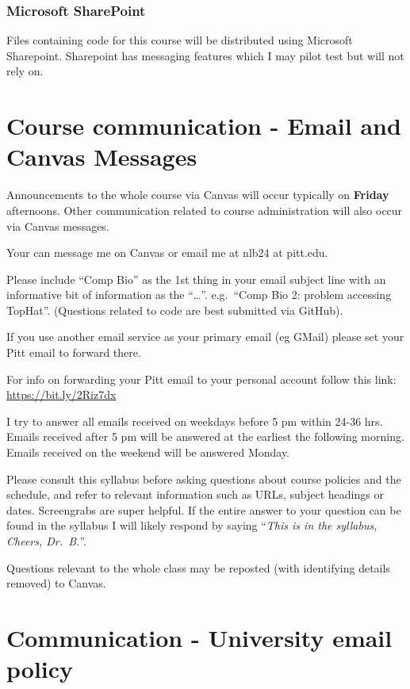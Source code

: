 \documentclass[
]{book}
\begin{document}
\hypertarget{microsoft-sharepoint}{%
\subsection{Microsoft SharePoint}\label{microsoft-sharepoint}}

Files containing code for this course will be distributed using Microsoft Sharepoint. Sharepoint has messaging features which I may pilot test but will not rely on.

\hypertarget{email_and_canvas_msg}{%
\chapter{Course communication - Email and Canvas Messages}\label{email_and_canvas_msg}}

Announcements to the whole course via Canvas will occur typically on \textbf{Friday} afternoons. Other communication related to course administration will also occur via Canvas messages.

Your can message me on Canvas or email me at nlb24 at pitt.edu.

Please include ``Comp Bio'' as the 1st thing in your email subject line with an informative bit of information as the ``\ldots{}''. e.g.~``Comp Bio 2: problem accessing TopHat''. (Questions related to code are best submitted via GitHub).

If you use another email service as your primary email (eg GMail) please set your Pitt email to forward there.

For info on forwarding your Pitt email to your personal account follow this link: \url{https://bit.ly/2Riz7dx}

I try to answer all emails received on weekdays before 5 pm within 24-36 hrs. Emails received after 5 pm will be answered at the earliest the following morning. Emails received on the weekend will be answered Monday.

Please consult this syllabus before asking questions about course policies and the schedule, and refer to relevant information such as URLs, subject headings or dates. Screengrabs are super helpful. If the entire answer to your question can be found in the syllabus I will likely respond by saying ``\emph{This is in the syllabus, Cheers, Dr.~B.}''.

Questions relevant to the whole class may be reposted (with identifying details removed) to Canvas.

\hypertarget{communication---university-email-policy}{%
\chapter{Communication - University email policy}\label{communication---university-email-policy}}
\end{document}
